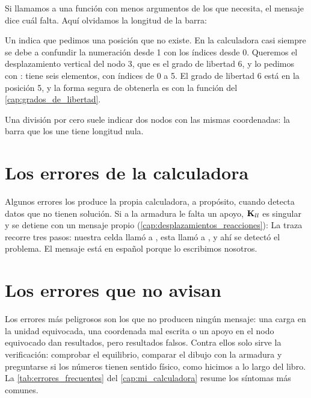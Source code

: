 Si llamamos a una función con menos argumentos de los que necesita, el
mensaje dice cuál falta. Aquí olvidamos la longitud de la barra:

Un  indica que pedimos una posición que no existe. En la
calculadora casi siempre se debe a confundir la numeración desde 1 con los
índices desde 0. Queremos el desplazamiento vertical del nodo 3, que es el
grado de libertad 6, y lo pedimos con :
 tiene seis elementos, con índices de 0 a 5. El grado de libertad 6
está en la posición 5, y la forma segura de obtenerla es con la función
 del \cref{cap:grados_de_libertad}.

Una división por cero suele indicar dos nodos con las mismas coordenadas: la
barra que los une tiene longitud nula.

\section{Los errores de la calculadora}\label{sec:b_calculadora}

Algunos errores los produce la propia calculadora, a propósito, cuando
detecta datos que no tienen solución. Si a la armadura le falta un apoyo,
$\mathbf{K}_{ll}$ es singular y  se detiene con un
mensaje propio (\cref{cap:desplazamientos_reacciones}):
La traza recorre tres pasos: nuestra celda llamó a ,
esta llamó a , y ahí se detectó el problema. El
mensaje está en español porque lo escribimos nosotros.

\section{Los errores que no avisan}\label{sec:b_silenciosos}

Los errores más peligrosos son los que no producen ningún mensaje: una carga
en la unidad equivocada, una coordenada mal escrita o un apoyo en el nodo
equivocado dan resultados, pero resultados falsos. Contra ellos solo sirve la
verificación: comprobar el equilibrio, comparar el dibujo con la armadura y
preguntarse si los números tienen sentido físico, como hicimos a lo largo
del libro. La \cref{tab:errores_frecuentes} del \cref{cap:mi_calculadora}
resume los síntomas más comunes.


